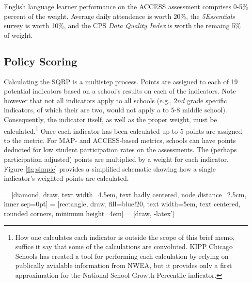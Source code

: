 \documentclass[sfsidenotes, justified]{tufte-handout}\usepackage[]{graphicx}\usepackage[]{color}
\begin{document}
English language learner performance on the ACCESS assessment comprises 0-5\% percent of the weight.  Average daily attendence is worth 20\%, the \emph{5Essentials} survey is worth 10\%, and the CPS \emph{Data Quality Index} is worth the remaing 5\% of weight.




\subsection{Policy Scoring}

Calculating the SQRP is a multistep process.  Points are assigned to each of 19 potential indicators based on a school's results on each of the indicators. Note however that not all indicators apply to all schools (e.g., $2nd$ grade specific indicators, of which their are two,  would not apply a to 5-8 middle school). Consequently, the indicator itself, as well as the proper weight, must be calculated.\footnote{How one calculates each indicator is outside the scope of this brief memo, suffice it say that some of the calculations are convoluted.  KIPP Chicago Schools has created a tool for performing each calculation by relying on publically avialable information from NWEA, but it provides only a first approximation for the National School Growth Percentile indicator.} Once each indicator has been calculated up to 5 points are assigned to the metric. For MAP- and ACCESS-based metrics, schools can have points deducted for low student participation rates on the assessments. The (perhaps participation adjusted) points are multiplied by a weight for each indicator. Figure \ref{fig:simple} provides a simplified schematic showing how a single indicator's weighted points are calculated.

 = [diamond, draw, 
    text width=4.5em, text badly centered, node distance=2.5cm, inner sep=0pt]
 = [rectangle, draw, fill=blue!20, 
    text width=5em, text centered, rounded corners, minimum height=4em]
 = [draw, -latex']
\end{document}
